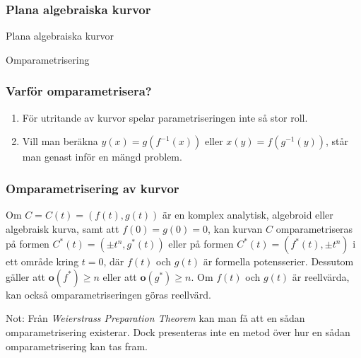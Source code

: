 \documentclass{beamer}
\begin{document}
\begin{frame}
	\frametitle{Plana algebraiska kurvor}
	\begin{center}
		\Large Plana algebraiska kurvor
		
		Omparametrisering
	\end{center}
\end{frame}

\begin{frame}
	\frametitle{Varför omparametrisera?}
	\begin{enumerate}
		\item För utritande av kurvor spelar parametriseringen inte så stor roll.
		
		\item Vill man beräkna $y(x) = g(f^{-1}(x))$ eller $x(y) = f(g^{-1}(y))$, står man genast inför en mängd problem.
	\end{enumerate}
\end{frame}

\begin{frame}
	\frametitle{Omparametrisering av kurvor}
\begin{Theorem}
	Om $C = C(t) = \left(f(t), g(t)\right)$ är en komplex analytisk, algebroid eller algebraisk kurva, samt att $f(0) = g(0) = 0$, kan kurvan $C$ omparametriseras på formen $C^*(t) = \left(\pm t^n, g^*(t)\right)$ eller på formen $C^*(t) = \left(f^*(t), \pm t^n \right)$ i ett område kring $t = 0$, där $f(t)$ och $g(t)$ är formella potensserier. Dessutom gäller att $\mathbf{o}\left(f^*\right) \geq n$ eller att $\mathbf{o}\left(g^*\right) \geq n$. Om $f(t)$ och $g(t)$ är reellvärda, kan också omparametriseringen göras reellvärd.
\end{Theorem}

\vspace{20pt}
\scriptsize Not: Från \emph{Weierstrass Preparation Theorem} kan man få att en sådan omparametrisering existerar. Dock presenteras inte en metod över hur en sådan omparametrisering kan tas fram.
\end{frame}
\end{document}
